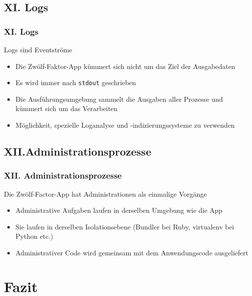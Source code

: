 \documentclass{beamer}
\begin{document}
			\subsection{XI. Logs}
				\begin{frame}
					\frametitle{XI. Logs}
					\begin{block}{Logs sind Eventströme}
					\begin{itemize}
						\item Die Zwölf-Faktor-App kümmert sich nicht um das Ziel der Ausgabedaten
						\item Es wird immer nach \texttt{stdout} geschrieben
						\item Die Ausführungsumgebung sammelt die Ausgaben aller Prozesse und kümmert sich um das Verarbeiten
						\item Möglichkeit, spezielle Loganalyse und -indizierungssysteme zu verwenden
					\end{itemize}	
					\end{block}
				\end{frame}
			\subsection{XII.\@ Administrationsprozesse}
			\begin{frame}
				\frametitle{XII. Administrationsprozesse}
				\begin{block}{Die Zwölf-Factor-App hat Administrationen als einmalige Vorgänge}
					\begin{itemize}
						\item Administrative Aufgaben laufen in derselben Umgebung wie die App
						\item Sie laufen in derselben Isolationsebene (Bundler bei Ruby, virtualenv bei Python etc.)
						\item Administrativer Code wird gemeinsam mit dem Anwendungscode ausgeliefert
					\end{itemize}
				\end{block}
				
			
			\end{frame}
		\section{Fazit}
\end{document}
